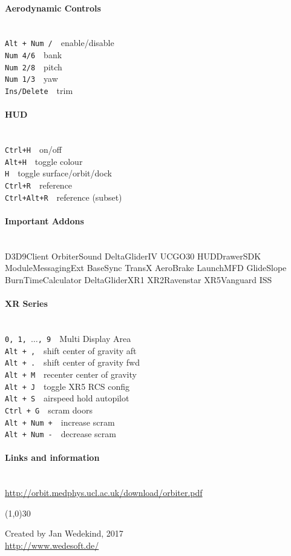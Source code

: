 \documentclass[11pt]{scrartcl} %
\newcommand{\command}[2]{\texttt{#1}~\dotfill{}~#2\\} %
\newcommand{\sectiontitle}[1]{\paragraph{#1} \ \\} %
\newcommand{\sep}{\hspace{5mm}}
\begin{document}
\sep
\begin{minipage}[t]{60mm}
\sectiontitle{Aerodynamic Controls}
\command{Alt + Num /}{enable/disable}
\command{Num 4/6}{bank}
\command{Num 2/8}{pitch}
\command{Num 1/3}{yaw}
\command{Ins/Delete}{trim}

\sectiontitle{HUD}
\command{Ctrl+H}{on/off}
\command{Alt+H}{toggle colour}
\command{H}{toggle surface/orbit/dock}
\command{Ctrl+R}{reference}
\command{Ctrl+Alt+R}{reference (subset)}

\sectiontitle{Important Addons}
D3D9Client
OrbiterSound
DeltaGliderIV
UCGO30
HUDDrawerSDK
ModuleMessagingExt
BaseSync
TransX
AeroBrake
LaunchMFD
GlideSlope
BurnTimeCalculator
DeltaGliderXR1
XR2Ravenstar
XR5Vanguard
ISS\\

\sectiontitle{XR Series}
\command{0, 1, $\ldots$, 9}{Multi Display Area}
\command{Alt + ,}{shift center of gravity aft}
\command{Alt + .}{shift center of gravity fwd}
\command{Alt + M}{recenter center of gravity}
\command{Alt + J}{toggle XR5 RCS config}
\command{Alt + S}{airspeed hold autopilot}
\command{Ctrl + G}{scram doors}
\command{Alt + Num +}{increase scram}
\command{Alt + Num -}{decrease scram}

\end{minipage}
\sep
\begin{minipage}[t]{60mm} %
\sectiontitle{Links and information}

\url{http://orbit.medphys.ucl.ac.uk/download/orbiter.pdf}

\linethickness{0.5mm} %
{\color{mygray}\line(1,0){30}} %

\footnotesize{
Created by Jan Wedekind, 2017\\
\url{http://www.wedesoft.de/}\\
}

\end{minipage} %
\end{document}
